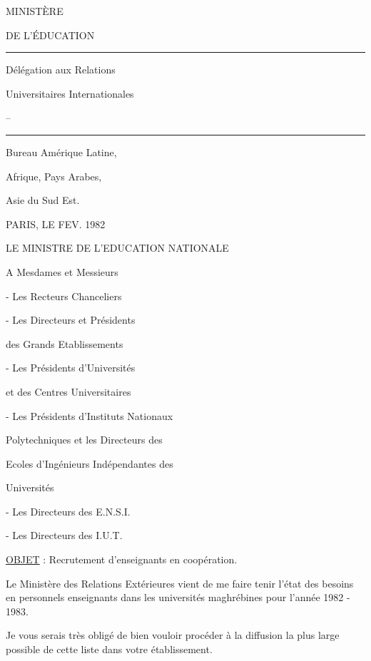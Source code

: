 MINISTÈRE\par DE L'ÉDUCATION\par\rule{9mm}{.4pt}

Délégation aux Relations\par Universitaires Internationales\par --\par\rule{10mm}{.4pt}

Bureau Amérique Latine,\par Afrique, Pays Arabes,\par Asie du Sud Est.

PARIS, LE FEV. 1982

LE MINISTRE DE L'EDUCATION NATIONALE

A Mesdames et Messieurs

- Les Recteurs Chanceliers\par
- Les Directeurs et Présidents\par des Grands Etablissements\par
- Les Présidents d'Universités\par et des Centres Universitaires\par
- Les Présidents d'Instituts Nationaux\par Polytechniques et les Directeurs des\par Ecoles d'Ingénieurs Indépendantes des\par Universités\par
- Les Directeurs des E.N.S.I.\par
- Les Directeurs des I.U.T.


\uline{OBJET} : Recrutement d'enseignants en coopération.

Le Ministère des Relations Extérieures vient de me faire tenir l'état des besoins en personnels enseignants dans les universités maghrébines pour l'année 1982 - 1983.

Je vous serais très obligé de bien vouloir procéder à la diffusion la plus large possible de cette liste dans votre établissement.

